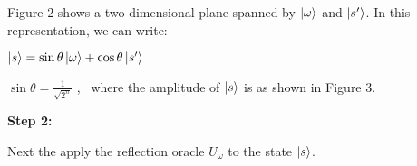 \documentclass{article}
\begin{document}
\begin{tikzpicture}[x=0.75pt,y=0.75pt,yscale=-1,xscale=1]
\end{tikzpicture}

Figure 2 shows a two dimensional plane spanned by $\ket{\omega}$ and $\ket{s'}$. In this representation, we can write:
\vspace{5mm}

\qquad $\ket{s} = \sin\theta\ket{\omega} + \cos\theta\ket{s'}$
\vspace{5mm}

\qquad $\sin\theta = \frac{1}{\sqrt{2^n}}$ , \ where the amplitude of $\ket{s}$ is as shown in Figure 3.
\vspace{5mm}

\textbf{Step 2:}
\vspace{5mm}

Next the apply the reflection oracle $U_\omega$ to the state $\ket{s}$.
\vspace{5mm}



\end{document}
